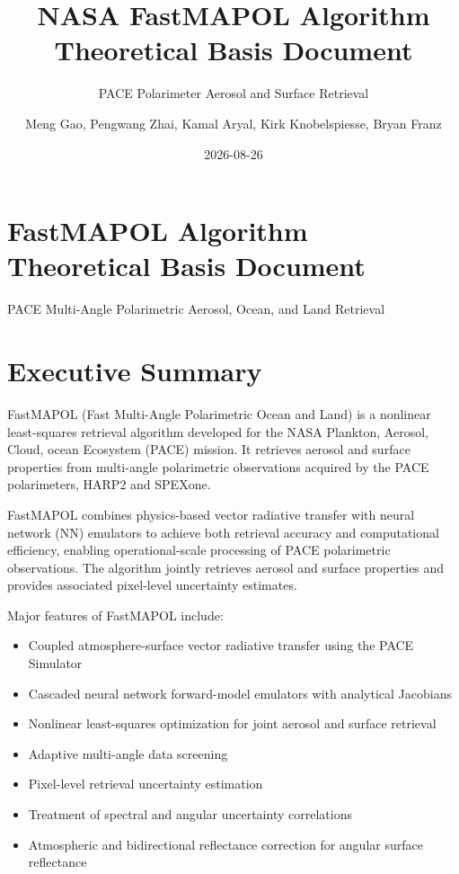 \documentclass[
  11pt,
  letterpaper,
  DIV=11,
  numbers=noendperiod]{scrreprt}
\title{NASA FastMAPOL Algorithm Theoretical Basis Document}
\subtitle{PACE Polarimeter Aerosol and Surface Retrieval}
\author{Meng Gao, Pengwang Zhai, Kamal Aryal, Kirk Knobelspiesse, Bryan
Franz}
\date{2026-08-26}
\providecommand{\tightlist}{%
  \setlength{\itemsep}{0pt}\setlength{\parskip}{0pt}}
\renewcommand*\contentsname{Table of contents}
\newcommand\contentsname{Table of contents}
\begin{document}
\maketitle

\renewcommand*\contentsname{Table of contents}
{
\hypersetup{linkcolor=}
\setcounter{tocdepth}{2}
\tableofcontents
}
\listoffigures
\listoftables


\chapter{FastMAPOL Algorithm Theoretical Basis
Document}\label{fastmapol-algorithm-theoretical-basis-document}

PACE Multi-Angle Polarimetric Aerosol, Ocean, and Land Retrieval

\hfill\break


\chapter{Executive Summary}\label{executive-summary}

FastMAPOL (Fast Multi-Angle Polarimetric Ocean and Land) is a nonlinear
least-squares retrieval algorithm developed for the NASA Plankton,
Aerosol, Cloud, ocean Ecosystem (PACE) mission. It retrieves aerosol and
surface properties from multi-angle polarimetric observations acquired
by the PACE polarimeters, HARP2 and SPEXone.

FastMAPOL combines physics-based vector radiative transfer with neural
network (NN) emulators to achieve both retrieval accuracy and
computational efficiency, enabling operational-scale processing of PACE
polarimetric observations. The algorithm jointly retrieves aerosol and
surface properties and provides associated pixel-level uncertainty
estimates.

Major features of FastMAPOL include:

\begin{itemize}
\tightlist
\item
  Coupled atmosphere-surface vector radiative transfer using the PACE
  Simulator
\item
  Cascaded neural network forward-model emulators with analytical
  Jacobians
\item
  Nonlinear least-squares optimization for joint aerosol and surface
  retrieval
\item
  Adaptive multi-angle data screening
\item
  Pixel-level retrieval uncertainty estimation
\item
  Treatment of spectral and angular uncertainty correlations
\item
  Atmospheric and bidirectional reflectance correction for angular
  surface reflectance
\end{itemize}
\end{document}
